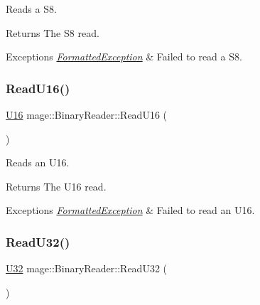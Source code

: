 Reads a {\ttfamily S8}.

\begin{DoxyReturn}{Returns}
The {\ttfamily S8} read. 
\end{DoxyReturn}

\begin{DoxyExceptions}{Exceptions}
{\em \hyperlink{structmage_1_1_formatted_exception}{Formatted\+Exception}} & Failed to read a {\ttfamily S8}. \\
\hline
\end{DoxyExceptions}
\hypertarget{classmage_1_1_binary_reader_a2b65c66fcb0b590d6f7ab5a8ffd96b83}{}\label{classmage_1_1_binary_reader_a2b65c66fcb0b590d6f7ab5a8ffd96b83} 
\subsubsection{\texorpdfstring{Read\+U16()}{ReadU16()}}
{\footnotesize\ttfamily \hyperlink{namespacemage_af69057eec1ce005c1c3b34ae33486f16}{U16} mage\+::\+Binary\+Reader\+::\+Read\+U16 (\begin{DoxyParamCaption}{ }\end{DoxyParamCaption})\hspace{0.3cm}{\ttfamily [protected]}}

Reads an {\ttfamily U16}.

\begin{DoxyReturn}{Returns}
The {\ttfamily U16} read. 
\end{DoxyReturn}

\begin{DoxyExceptions}{Exceptions}
{\em \hyperlink{structmage_1_1_formatted_exception}{Formatted\+Exception}} & Failed to read an {\ttfamily U16}. \\
\hline
\end{DoxyExceptions}
\hypertarget{classmage_1_1_binary_reader_acb2d579ef62fd3cd5b3c6193d748dda8}{}\label{classmage_1_1_binary_reader_acb2d579ef62fd3cd5b3c6193d748dda8} 
\subsubsection{\texorpdfstring{Read\+U32()}{ReadU32()}}
{\footnotesize\ttfamily \hyperlink{namespacemage_a41c104c036fba3756a74e19f793eeaa1}{U32} mage\+::\+Binary\+Reader\+::\+Read\+U32 (\begin{DoxyParamCaption}{ }\end{DoxyParamCaption})\hspace{0.3cm}{\ttfamily [protected]}}

